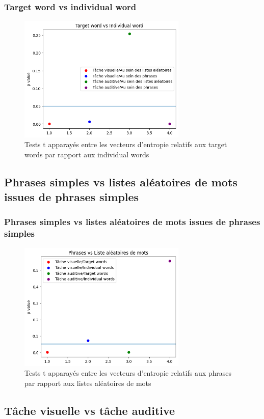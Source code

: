 \documentclass{beamer}
\begin{document}
\begin{frame}
\frametitle{Target word vs individual word}
\begin{figure}[!ht]
    \centering
    \includegraphics[width=8cm]{Targetword_vs_Individualword.png}
    \caption{Tests t apparayés entre les vecteurs d'entropie relatifs aux target words par rapport aux individual words}
    \label{fig6.1}
\end{figure}
\end{frame}

\subsection{Phrases simples vs listes aléatoires de mots issues de phrases simples}

\begin{frame}
\frametitle{Phrases simples vs listes aléatoires de mots issues de phrases simples}
\begin{figure}[!ht]
    \centering
    \includegraphics[width=8cm]{Phrases_vs_Listes_aleatoires.png}
    \caption{Tests t apparayés entre les vecteurs d'entropie relatifs aux phrases par rapport aux listes aléatoires de mots}
    \label{fig6.2}
\end{figure}
\end{frame}

\subsection{Tâche visuelle vs tâche auditive}
\end{document}
